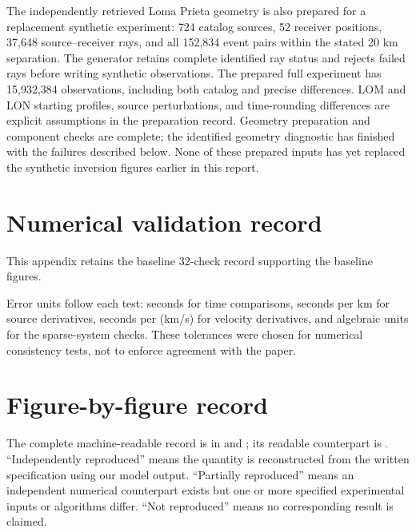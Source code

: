 \documentclass[11pt]{article}
\begin{document}
The independently retrieved Loma Prieta geometry is also prepared for a
replacement synthetic experiment: 724 catalog sources, 52 receiver positions,
37,648 source--receiver rays, and all 152,834 event pairs within the stated
20 km separation. The generator retains complete identified ray status and
rejects failed rays before writing synthetic observations. The prepared
full experiment has 15,932,384 observations, including both catalog and
precise differences. LOM and LON starting profiles, source perturbations,
and time-rounding differences are explicit assumptions in the preparation
record. Geometry preparation and component checks are complete; the identified
geometry diagnostic has finished with the failures described below. None of these prepared inputs has yet
replaced the synthetic inversion figures earlier in this report.






\clearpage

\clearpage
\appendix
\section{Numerical validation record}\label{sec:validation}
This appendix retains the baseline 32-check record supporting the baseline figures.

Error units follow each test: seconds for time comparisons, seconds per km
for source derivatives, seconds per (km/s) for velocity derivatives, and
algebraic units for the sparse-system checks. These tolerances were chosen
for numerical consistency tests, not to enforce agreement with the paper.

\section{Figure-by-figure record}
The complete machine-readable record is in 
and ; its readable counterpart is
. ``Independently reproduced'' means the quantity is
reconstructed from the written specification using our model output.
``Partially reproduced'' means an independent numerical counterpart exists
but one or more specified experimental inputs or algorithms differ.
``Not reproduced'' means no corresponding result is claimed.

\end{document}
